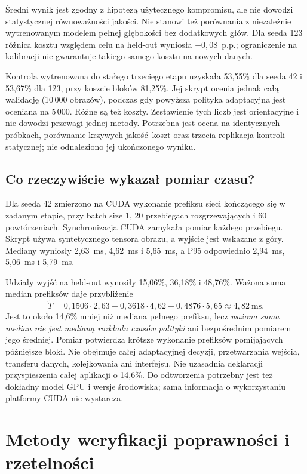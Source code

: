 \documentclass[12pt,a4paper]{article}
\newcommand{\pp}{p.p.}
\begin{document}
Średni wynik jest zgodny z hipotezą użytecznego kompromisu, ale nie dowodzi
statystycznej równoważności jakości. Nie stanowi też porównania
z niezależnie wytrenowanym modelem pełnej głębokości bez dodatkowych głów.
Dla seeda 123 różnica kosztu względem celu na held-out wyniosła $+0{,}08$~\pp;
ograniczenie
na kalibracji nie gwarantuje takiego samego kosztu na nowych danych.

Kontrola wytrenowana do stałego trzeciego etapu uzyskała 53,55\% dla seeda
42 i 53,67\% dla 123, przy koszcie bloków 81,25\%. Jej skrypt ocenia jednak
całą walidację (10\,000 obrazów), podczas gdy powyższa polityka adaptacyjna
jest oceniana na 5\,000. Różne są też koszty. Zestawienie tych liczb jest
orientacyjne i nie dowodzi przewagi jednej metody. Potrzebna jest ocena
na identycznych próbkach, porównanie krzywych jakość--koszt oraz trzecia
replikacja kontroli statycznej; nie odnaleziono jej ukończonego wyniku.

\subsection{Co rzeczywiście wykazał pomiar czasu?}

Dla seeda 42 zmierzono na CUDA wykonanie prefiksu sieci kończącego się
w zadanym etapie, przy batch size 1, 20 przebiegach rozgrzewających
i 60 powtórzeniach. Synchronizacja CUDA zamykała pomiar każdego przebiegu.
Skrypt używa syntetycznego tensora obrazu, a wyjście jest wskazane z góry.
Mediany wyniosły 2,63~ms, 4,62~ms i 5,65~ms, a P95 odpowiednio
2,94~ms, 5,06~ms i 5,79~ms.

Udziały wyjść na held-out wynosiły 15,06\%, 36,18\% i 48,76\%.
Ważona suma median prefiksów daje przybliżenie
\begin{equation}
\widetilde{T}=0{,}1506\cdot2{,}63+0{,}3618\cdot4{,}62+
0{,}4876\cdot5{,}65\approx4{,}82\ \mathrm{ms}.
\end{equation}
Jest to około 14,6\% mniej niż mediana pełnego prefiksu, lecz
\emph{ważona suma median nie jest medianą rozkładu czasów polityki}
ani bezpośrednim pomiarem jego średniej. Pomiar potwierdza krótsze wykonanie
prefiksów pomijających późniejsze bloki. Nie obejmuje całej adaptacyjnej
decyzji, przetwarzania wejścia, transferu danych, kolejkowania ani interfejsu.
Nie uzasadnia deklaracji przyspieszenia całej aplikacji o 14,6\%.
Do odtworzenia potrzebny jest też dokładny model GPU i wersje środowiska;
sama informacja o wykorzystaniu platformy CUDA nie wystarcza.

\section{Metody weryfikacji poprawności i rzetelności}
\end{document}
